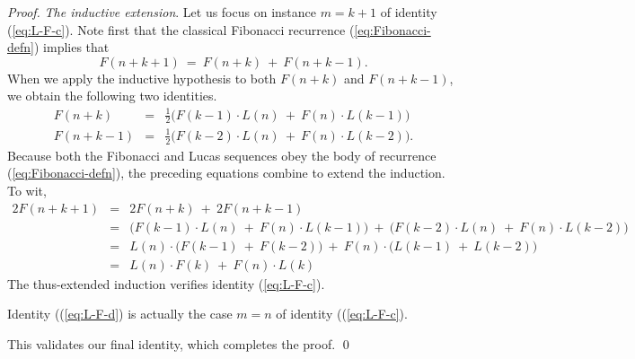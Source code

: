 \begin{proof}
\noindent
{\it The inductive extension}.
Let us focus on instance $m = k+1$ of identity (\ref{eq:L-F-c}).  Note
first that the classical Fibonacci recurrence
(\ref{eq:Fibonacci-defn}) implies that
\[ F(n + k +1) \ = \ F(n + k) \ + \ F(n + k - 1). \]
When we apply the inductive hypothesis to both $F(n + k)$ and $F(n + k
- 1)$, we obtain the following two identities.
\begin{eqnarray*}
F(n + k) & = & \frac{1}{2} \big( F(k-1) \cdot L(n) \ + \ F(n) \cdot
L(k-1) \big) \\
F(n + k - 1) & = & \frac{1}{2} \big( F(k-2) \cdot L(n) \ + \ F(n) \cdot L(k-2) \big).
\end{eqnarray*}
Because both the Fibonacci and Lucas sequences obey the body of
recurrence (\ref{eq:Fibonacci-defn}), the preceding equations combine
to extend the induction.  To wit,
\begin{eqnarray*}
2 F(n + k +1) & = & 2 F(n + k) \ + \ 2 F(n + k - 1) \\
              & = & 
\big( F(k-1) \cdot L(n) \ + \ F(n) \cdot L(k-1) \big)
\ + \
\big( F(k-2) \cdot L(n) \ + \ F(n) \cdot L(k-2) \big) \\
              & = &
L(n) \cdot \big( F(k-1) \ + \ F(k-2) \big)
\ + \
F(n) \cdot \big( L(k-1) \ + \ L(k-2) \big) \\
              & = &
L(n) \cdot F(k) \ + \ F(n) \cdot L(k)
\end{eqnarray*}
The thus-extended induction verifies identity (\ref{eq:L-F-c}).

\bigskip

Identity ((\ref{eq:L-F-d}) is actually the case $m=n$ of identity
((\ref{eq:L-F-c}).

This validates our final identity, which completes the proof.  \qed
\end{proof}


